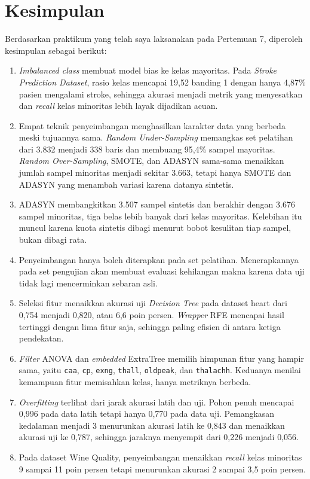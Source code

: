 \documentclass[a4paper,oneside,12pt]{report}
\begin{document}
\chapter{Kesimpulan}
Berdasarkan praktikum yang telah saya laksanakan pada Pertemuan 7, diperoleh kesimpulan sebagai berikut:
\begin{enumerate}[noitemsep, topsep=2pt, parsep=0pt, partopsep=0pt]
    \item \textit{Imbalanced class} membuat model bias ke kelas mayoritas. Pada \textit{Stroke Prediction Dataset}, rasio kelas mencapai 19,52 banding 1 dengan hanya 4,87\% pasien mengalami stroke, sehingga akurasi menjadi metrik yang menyesatkan dan \textit{recall} kelas minoritas lebih layak dijadikan acuan.
    \item Empat teknik penyeimbangan menghasilkan karakter data yang berbeda meski tujuannya sama. \textit{Random Under-Sampling} memangkas set pelatihan dari 3.832 menjadi 338 baris dan membuang 95,4\% sampel mayoritas. \textit{Random Over-Sampling}, SMOTE, dan ADASYN sama-sama menaikkan jumlah sampel minoritas menjadi sekitar 3.663, tetapi hanya SMOTE dan ADASYN yang menambah variasi karena datanya sintetis.
    \item ADASYN membangkitkan 3.507 sampel sintetis dan berakhir dengan 3.676 sampel minoritas, tiga belas lebih banyak dari kelas mayoritas. Kelebihan itu muncul karena kuota sintetis dibagi menurut bobot kesulitan tiap sampel, bukan dibagi rata.
    \item Penyeimbangan hanya boleh diterapkan pada set pelatihan. Menerapkannya pada set pengujian akan membuat evaluasi kehilangan makna karena data uji tidak lagi mencerminkan sebaran asli.
    \item Seleksi fitur menaikkan akurasi uji \textit{Decision Tree} pada dataset heart dari 0,754 menjadi 0,820, atau 6,6 poin persen. \textit{Wrapper} RFE mencapai hasil tertinggi dengan lima fitur saja, sehingga paling efisien di antara ketiga pendekatan.
    \item \textit{Filter} ANOVA dan \textit{embedded} ExtraTree memilih himpunan fitur yang hampir sama, yaitu \texttt{caa}, \texttt{cp}, \texttt{exng}, \texttt{thall}, \texttt{oldpeak}, dan \texttt{thalachh}. Keduanya menilai kemampuan fitur memisahkan kelas, hanya metriknya berbeda.
    \item \textit{Overfitting} terlihat dari jarak akurasi latih dan uji. Pohon penuh mencapai 0,996 pada data latih tetapi hanya 0,770 pada data uji. Pemangkasan kedalaman menjadi 3 menurunkan akurasi latih ke 0,843 dan menaikkan akurasi uji ke 0,787, sehingga jaraknya menyempit dari 0,226 menjadi 0,056.
    \item Pada dataset Wine Quality, penyeimbangan menaikkan \textit{recall} kelas minoritas 9 sampai 11 poin persen tetapi menurunkan akurasi 2 sampai 3,5 poin persen.
\end{enumerate}
\end{document}
